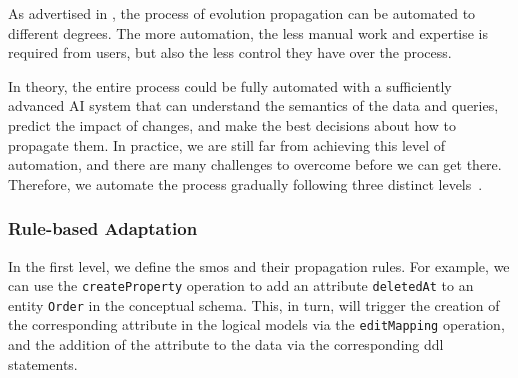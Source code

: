 As advertised in , the process of evolution propagation can be automated to different degrees. The more automation, the less manual work and expertise is required from users, but also the less control they have over the process.




In theory, the entire process could be fully automated with a sufficiently advanced AI system that can understand the semantics of the data and queries, predict the impact of changes, and make the best decisions about how to propagate them. In practice, we are still far from achieving this level of automation, and there are many challenges to overcome before we can get there. Therefore, we automate the process gradually following three distinct levels~\citep{ideas2022vision}.

\subsubsection{Rule-based Adaptation}

In the first level, we define the \acrshort{smo}s and their propagation rules. For example, we can use the \texttt{createProperty} operation to add an attribute \texttt{deletedAt} to an entity \texttt{Order} in the conceptual schema. This, in turn, will trigger the creation of the corresponding attribute in the logical models via the \texttt{editMapping} operation, and the addition of the attribute to the data via the corresponding \acrshort{ddl} statements.

